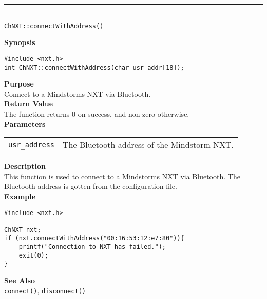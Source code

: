 \noindent
\vspace{5pt}
\rule{4.5in}{0.015in}\\
\noindent
{\LARGE \texttt{ChNXT::connectWithAddress()} }\\


\noindent
{\bf Synopsis}
\vspace{-8pt}
\begin{verbatim}
#include <nxt.h>
int ChNXT::connectWithAddress(char usr_addr[18]);
\end{verbatim}

\noindent
{\bf Purpose}\\
Connect to a Mindstorms NXT via Bluetooth.\\

\noindent
{\bf Return Value}\\
The function returns 0 on success, and non-zero otherwise.\\

\noindent
{\bf Parameters}\\
\vspace{-0.1in}
\begin{description}
\item
\begin{tabular}{p{20mm}p{135mm}}
\texttt{usr\_address} & The Bluetooth address of the Mindstorm NXT.
\end{tabular}
\end{description}

\noindent
{\bf Description}\\
This function is used to connect to a Mindstorms NXT via Bluetooth. The Bluetooth address is gotten from the configuration file.\\

\noindent
{\bf Example}
\begin{verbatim}
#include <nxt.h> 

ChNXT nxt;
if (nxt.connectWithAddress("00:16:53:12:e7:80")){
    printf("Connection to NXT has failed.");
    exit(0);
}
\end{verbatim}

\noindent
{\bf See Also}\\
\texttt{connect()}, \texttt{disconnect()}\\
